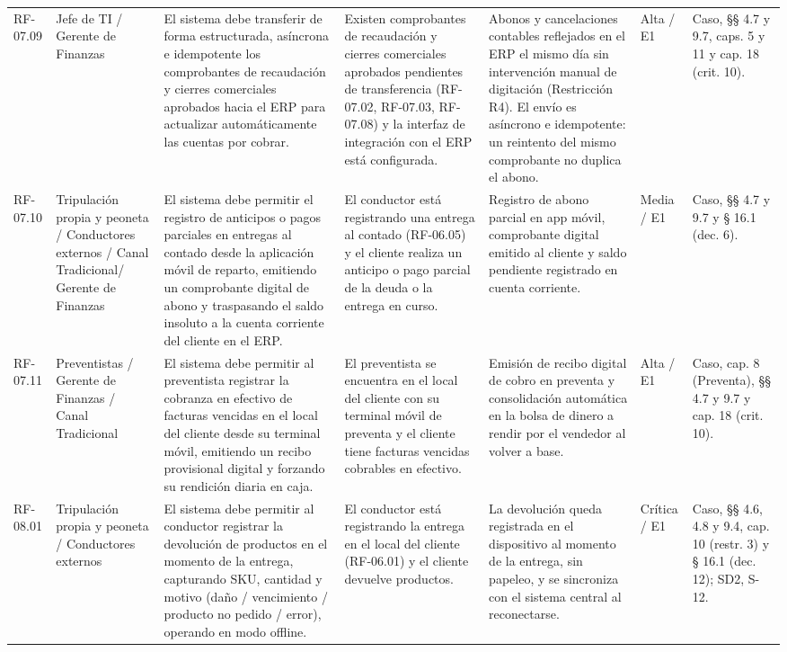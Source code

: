 {\begin{longtable}{@{}F{0.062} F{0.080} F{0.195} F{0.160} F{0.240} F{0.093} F{0.170}@{}}
  RF-07.09 & Jefe de TI / Gerente de Finanzas & El sistema debe transferir de forma estructurada, asíncrona e idempotente los comprobantes de recaudación y cierres comerciales aprobados hacia el ERP para actualizar automáticamente las cuentas por cobrar. & Existen comprobantes de recaudación y cierres comerciales aprobados pendientes de transferencia (RF-07.02, RF-07.03, RF-07.08) y la interfaz de integración con el ERP está configurada. & Abonos y cancelaciones contables reflejados en el ERP el mismo día sin intervención manual de digitación (Restricción R4). El envío es asíncrono e idempotente: un reintento del mismo comprobante no duplica el abono. & Alta / E1 & Caso, §§ 4.7 y 9.7, caps. 5 y 11 y cap. 18 (crit. 10). \\
  RF-07.10 & Tripulación propia y peoneta / Conductores externos / Canal Tradicional/ Gerente de Finanzas & El sistema debe permitir el registro de anticipos o pagos parciales en entregas al contado desde la aplicación móvil de reparto, emitiendo un comprobante digital de abono y traspasando el saldo insoluto a la cuenta corriente del cliente en el ERP. & El conductor está registrando una entrega al contado (RF-06.05) y el cliente realiza un anticipo o pago parcial de la deuda o la entrega en curso. & Registro de abono parcial en app móvil, comprobante digital emitido al cliente y saldo pendiente registrado en cuenta corriente. & Media / E1 & Caso, §§ 4.7 y 9.7 y § 16.1 (dec. 6). \\
  RF-07.11 & Preventistas / Gerente de Finanzas / Canal Tradicional & El sistema debe permitir al preventista registrar la cobranza en efectivo de facturas vencidas en el local del cliente desde su terminal móvil, emitiendo un recibo provisional digital y forzando su rendición diaria en caja. & El preventista se encuentra en el local del cliente con su terminal móvil de preventa y el cliente tiene facturas vencidas cobrables en efectivo. & Emisión de recibo digital de cobro en preventa y consolidación automática en la bolsa de dinero a rendir por el vendedor al volver a base. & Alta / E1 & Caso, cap. 8 (Preventa), §§ 4.7 y 9.7 y cap. 18 (crit. 10). \\
  RF-08.01 & Tripulación propia y peoneta / Conductores externos & El sistema debe permitir al conductor registrar la devolución de productos en el momento de la entrega, capturando SKU, cantidad y motivo (daño / vencimiento / producto no pedido / error), operando en modo offline. & El conductor está registrando la entrega en el local del cliente (RF-06.01) y el cliente devuelve productos. & La devolución queda registrada en el dispositivo al momento de la entrega, sin papeleo, y se sincroniza con el sistema central al reconectarse. & Crítica / E1 & Caso, §§ 4.6, 4.8 y 9.4, cap. 10 (restr. 3) y § 16.1 (dec. 12); SD2, S-12. \\

\end{longtable}}
